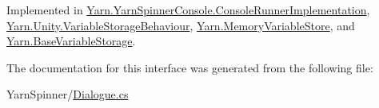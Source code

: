 Implemented in \hyperlink{a00055_abeda3f7eb2611b48abfed778c6c37e6e}{Yarn.\-Yarn\-Spinner\-Console.\-Console\-Runner\-Implementation}, \hyperlink{a00170_a08ff36ec352a979b5db074f66ec9e189}{Yarn.\-Unity.\-Variable\-Storage\-Behaviour}, \hyperlink{a00130_ae7d221c8347f380fe0b79a7ba434764c}{Yarn.\-Memory\-Variable\-Store}, and \hyperlink{a00043_aa65aa327c08a1ff3287ced01bb765271}{Yarn.\-Base\-Variable\-Storage}.



The documentation for this interface was generated from the following file\-:\begin{DoxyCompactItemize}
\item 
Yarn\-Spinner/\hyperlink{a00285}{Dialogue.\-cs}\end{DoxyCompactItemize}
